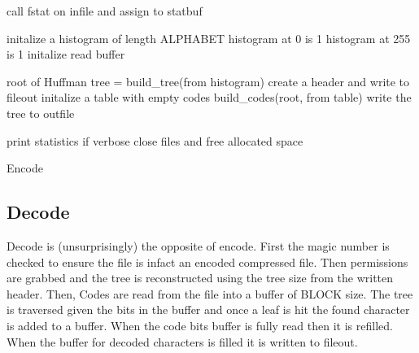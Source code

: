 \documentclass[12pt]{article}
\begin{document}
\begin{algorithm}
	call fstat on infile and assign to statbuf\;

	initalize a histogram of length ALPHABET\;
	histogram at 0 is 1\;
	histogram at 255 is 1\;
	initalize read buffer\;


	root of Huffman tree = build\_tree(from histogram)\;
	create a header and write to fileout\;	
	initalize a table with empty codes\;
	build\_codes(root, from table)\;
	write the tree to outfile\;



	print statistics if verbose\;
	close files and free allocated space\;

	\caption{Encode}\label{encode}
\end{algorithm}

\subsection{Decode}

Decode is (unsurprisingly) the opposite of encode. First the magic number is checked
to ensure the file is infact an encoded compressed file. Then permissions are grabbed
and the tree is reconstructed using the tree size from the written header. 
Then, Codes are read from the file into a buffer of BLOCK size. The tree is traversed
given the bits in the buffer and once a leaf is hit the found character is added to a buffer.
When the code bits buffer is fully read then it is refilled. When the buffer for decoded characters
is filled it is written to fileout.
\end{document}
